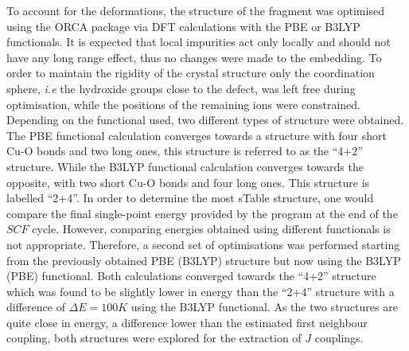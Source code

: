 \documentclass[12pt]{report}
\numberwithin{equation}{section}
\begin{document}
To account for the deformations, the structure of the fragment was optimised using the ORCA package via DFT calculations with the PBE or B3LYP functionals.
It is expected that local impurities act only locally and should not have any long range effect, thus no changes were made to the embedding.
To order to maintain the rigidity of the crystal structure only the coordination sphere, \textit{i.e} the hydroxide groups close to the defect, was left free during optimisation, while the positions of the remaining ions were constrained.
Depending on the functional used, two different types of structure were obtained.
The PBE functional calculation converges towards a structure with four short Cu-O bonds and two long ones, this structure is referred to as the ``4+2'' structure.
While the B3LYP functional calculation converges towards the opposite, with two short Cu-O bonds and four long ones. This structure is labelled ``2+4''.
In order to determine the most sTable structure, one would compare the final single-point energy provided by the program at the end of the $SCF$ cycle. However, comparing energies obtained using different functionals is not appropriate.
Therefore, a second set of optimisations was performed starting from the previously obtained PBE (B3LYP) structure but now using the B3LYP (PBE) functional.
Both calculations converged towards the ``4+2'' structure which was found to be slightly lower in energy than the ``2+4'' structure with a difference of $\Delta E=100 K$ using the B3LYP functional.
As the two structures are quite close in energy, a difference lower than the estimated first neighbour coupling, both structures were explored for the extraction of $J$ couplings.
\end{document}
